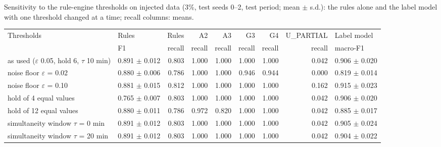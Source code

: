 \documentclass[11pt,a4paper]{article}
\makeatletter
\newenvironment{stable}{\par\addvspace{8pt}\noindent\begin{minipage}{\textwidth}\def\@captype{table}\centering}{\end{minipage}\par\addvspace{8pt}}
\makeatother
\begin{document}
\begin{stable}
\caption{Sensitivity to the rule-engine thresholds on injected data (3\%, test seeds 0--2, test period; mean $\pm$ s.d.): the rules alone and the label model with one threshold changed at a time; recall columns: means.}\label{tab:s-thresholds}
\scriptsize\setlength{\tabcolsep}{3pt}
\begin{tabular}{@{}>{\raggedright\arraybackslash}p{3.9cm} l r r r r r r l@{}}
\toprule
Thresholds & Rules & Rules & A2 & A3 & G3 & G4 & U\_PARTIAL & Label model \\
 & F1 & recall & recall & recall & recall & recall & recall & macro-F1 \\
\midrule
as used ($\varepsilon$ 0.05, hold 6, $\tau$ 10 min) & 0.891 $\pm$ 0.012 & 0.803 & 1.000 & 1.000 & 1.000 & 1.000 & 0.042 & 0.906 $\pm$ 0.020 \\
noise floor $\varepsilon$ = 0.02 & 0.880 $\pm$ 0.006 & 0.786 & 1.000 & 1.000 & 0.946 & 0.944 & 0.000 & 0.819 $\pm$ 0.014 \\
noise floor $\varepsilon$ = 0.10 & 0.881 $\pm$ 0.015 & 0.812 & 1.000 & 1.000 & 1.000 & 1.000 & 0.162 & 0.915 $\pm$ 0.023 \\
hold of 4 equal values & 0.765 $\pm$ 0.007 & 0.803 & 1.000 & 1.000 & 1.000 & 1.000 & 0.042 & 0.906 $\pm$ 0.020 \\
hold of 12 equal values & 0.880 $\pm$ 0.011 & 0.786 & 0.972 & 0.820 & 1.000 & 1.000 & 0.042 & 0.885 $\pm$ 0.017 \\
simultaneity window $\tau$ = 0 min & 0.891 $\pm$ 0.012 & 0.803 & 1.000 & 1.000 & 1.000 & 1.000 & 0.042 & 0.905 $\pm$ 0.024 \\
simultaneity window $\tau$ = 20 min & 0.891 $\pm$ 0.012 & 0.803 & 1.000 & 1.000 & 1.000 & 1.000 & 0.042 & 0.904 $\pm$ 0.022 \\
\bottomrule
\end{tabular}
\end{stable}
\end{document}
